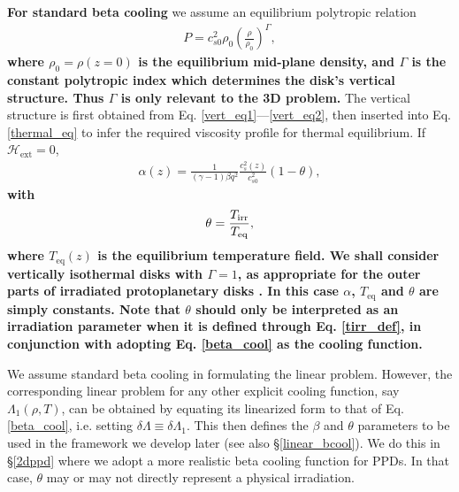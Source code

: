 {\bf For standard beta cooling} we assume an 
equilibrium polytropic relation 
\begin{align}\label{poly_vert} 
  P  =
c_{s0}^2\rho_0\left(\frac{\rho}{\rho_0}\right)^\Gamma,
\end{align}
{\bf where $\rho_0 = \rho(z=0)$ is the equilibrium mid-plane density, and    
$\Gamma$ is the constant polytropic index which determines the disk's
  vertical structure. Thus $\Gamma$ is only relevant to the 3D
  problem.}     
The vertical structure is first obtained from 
Eq. \ref{vert_eq1}---\ref{vert_eq2}, %
then inserted into 
Eq. \ref{thermal_eq} to infer the required viscosity profile for
thermal equilibrium. If  $\mathcal{H}_\mathrm{ext}=0$, 
\begin{align}\label{alpha_beta_relation}
\alpha(z) = \frac{1}{(\gamma-1)\beta
   q^2}\frac{c_s^2(z)}{c_{s0}^2}\left(1 - \theta\right),
\end{align} 
{\bf with 
  \begin{align}\label{tirr_def}
    \theta = \frac{T_\mathrm{irr}}{T_\mathrm{eq}},
  \end{align}
   where $T_\mathrm{eq}(z)$ is the equilibrium temperature field.
   We shall consider vertically isothermal disks with $\Gamma=1$, as
  appropriate for the outer parts of irradiated protoplanetary disks
   \citep{chiang97}. In this case  
   $\alpha$, $T_\mathrm{eq}$ and $\theta$ are simply constants. 
    Note that $\theta$  
    should only be interpreted as an irradiation parameter when it is 
    defined through Eq. \ref{tirr_def}, in conjunction with adopting  
    Eq. \ref{beta_cool} as the cooling function. 
 } 




We assume standard beta cooling in formulating the linear
problem. However, the corresponding linear problem for  
any other explicit cooling function, say $\Lambda_1(\rho,T)$, can be  
obtained by equating its linearized form to 
that of Eq. \ref{beta_cool}, i.e. setting $\delta \Lambda \equiv
\delta \Lambda_1$. This then defines the $\beta$ and $\theta$
parameters to be used in the framework we develop later (see also 
\S\ref{linear_bcool}). We do this in \S\ref{2dppd} where we adopt a  
more realistic beta cooling function for PPDs. In that case, $\theta$ 
may or may not directly represent a physical irradiation.     

